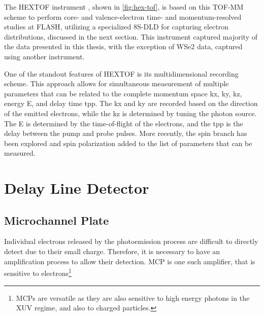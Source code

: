 The \gls{HEXTOF} instrument \cite{kutnyakhovTimeMomentumresolvedPhotoemission2020}, shown in \cref{fig:hex-tof}, is based on this \gls{TOF}-\gls{MM} scheme to perform core- and valence-electron time- and momentum-resolved studies at \gls{FLASH}, utilizing a specialized \num{8}S-\gls{DLD} for capturing electron distributions, discussed in the next section. This instrument captured majority of the data presented in this thesis,  with the exception of \gls{WSe2} data, captured using another instrument.

One of the standout features of \gls{HEXTOF} is its multidimensional recording scheme. This approach allows for simultaneous measurement of multiple parameters that can be related to the complete momentum space \gls{kx}, \gls{ky}, \gls{kz}, energy \gls{E}, and delay time \gls{tpp}. The \gls{kx} and \gls{ky} are recorded based on the direction of the emitted electrons, while the \gls{kz} is determined by tuning the photon source. The \gls{E} is determined by the time-of-flight of the electrons, and the \gls{tpp} is the delay between the pump and probe pulses. More recently, the spin branch has been explored and spin polarization added to the list of parameters that can be measured. 

\section{Delay Line Detector}\label{section:dld}
\subsection{Microchannel Plate}
Individual electrons released by the photoemission process are difficult to directly detect due to their small charge.  Therefore, it is necessary to have an amplification process to allow their detection. \Gls{MCP} is one such amplifier, that is sensitive to electrons\footnote{\Glspl{MCP} are versatile as they are also sensitive to high energy photons in the \gls{XUV} regime, and also to charged particles.}

